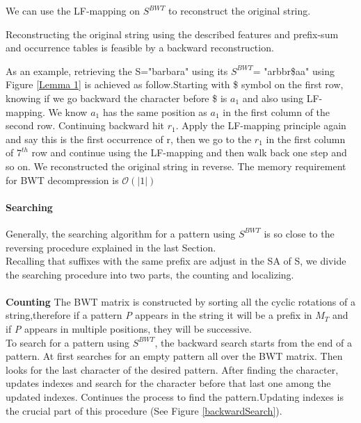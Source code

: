 \documentclass[11pt,a4paper]{report}
\begin{document}
We can use the LF-mapping on $S^{ BWT}$ to reconstruct
the original string. 

Reconstructing the original string using the 
described features and prefix-sum and 
occurrence tables is feasible by a backward 
reconstruction.

As an example, retrieving the S="barbara"
using its $S^{BWT}$= "arbbr\$aa" using Figure 
\ref {Lemma 1} is achieved as follow.Starting
with \$ symbol on the first row, knowing if 
we go backward the character before \$ is 
$a_1$ and also using LF-mapping. We know  
$a_1$ has the same position as $a_1$ in 
the first column of the second row. Continuing 
backward hit $r_1$. Apply the LF-mapping principle 
again and say this is the first occurrence of r, 
then we go to the  $r_1$ in the first column of 
$7^{th}$ row and continue using the LF-mapping 
and then walk back one step and so on. We 
reconstructed the original string in reverse. 
The memory requirement for BWT decompression is  
$\mathcal{O}(\lvert 1 \rvert)$ \\



\paragraph{Searching}

Generally, the searching algorithm for a pattern using
 $S^{BWT}$ is so close to the reversing procedure 
explained in the last Section.\\
Recalling that suffixes with the same prefix are adjust
in the SA of S, we divide the searching procedure into
two parts, the counting and localizing.\\\\

\textbf{Counting}
The BWT matrix is constructed by sorting all the cyclic
rotations of a string,therefore if a pattern \emph{P} 
appears in the string it will be a prefix in $M_{T}$ 
and if \emph {P} appears in multiple positions, they 
will be successive.\\ 
To search for a pattern using $S^{BWT}$, the backward 
search starts from the end of a pattern.
At first searches for an empty  pattern all over the 
BWT matrix. Then looks for the last character of the 
desired pattern. After finding the character, updates 
indexes and search for the character before that last 
one among the updated indexes. Continues the process 
to find the pattern.Updating indexes is the crucial 
part of this procedure (See Figure \ref{backwardSearch}).\\\\
\end{document}
